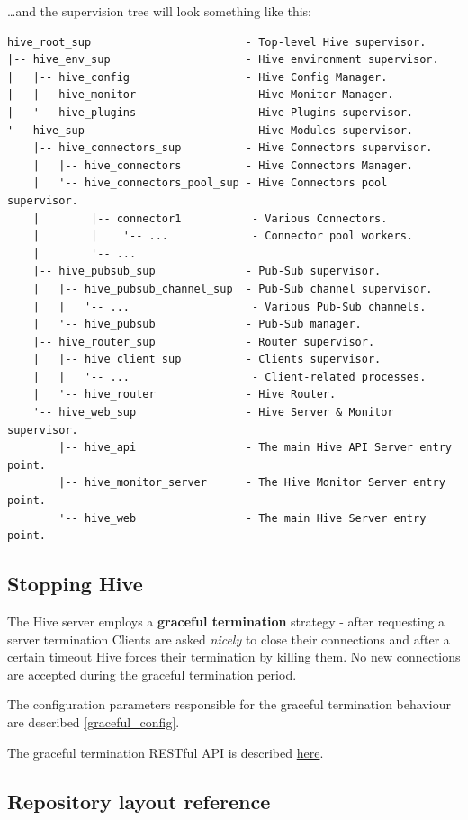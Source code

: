 \documentclass[a4paper]{article}
\begin{document}
\noindent
\ldots{}and the supervision tree will look something like this:


\begin{verbatim}
hive_root_sup                        - Top-level Hive supervisor.
|-- hive_env_sup                     - Hive environment supervisor.
|   |-- hive_config                  - Hive Config Manager.
|   |-- hive_monitor                 - Hive Monitor Manager.
|   '-- hive_plugins                 - Hive Plugins supervisor.
'-- hive_sup                         - Hive Modules supervisor.
    |-- hive_connectors_sup          - Hive Connectors supervisor.
    |   |-- hive_connectors          - Hive Connectors Manager.
    |   '-- hive_connectors_pool_sup - Hive Connectors pool supervisor.
    |        |-- connector1           - Various Connectors.
    |        |    '-- ...             - Connector pool workers.
    |        '-- ...
    |-- hive_pubsub_sup              - Pub-Sub supervisor.
    |   |-- hive_pubsub_channel_sup  - Pub-Sub channel supervisor.
    |   |   '-- ...                   - Various Pub-Sub channels.
    |   '-- hive_pubsub              - Pub-Sub manager.
    |-- hive_router_sup              - Router supervisor.
    |   |-- hive_client_sup          - Clients supervisor.
    |   |   '-- ...                   - Client-related processes.
    |   '-- hive_router              - Hive Router.
    '-- hive_web_sup                 - Hive Server & Monitor supervisor.
        |-- hive_api                 - The main Hive API Server entry point.
        |-- hive_monitor_server      - The Hive Monitor Server entry point.
        '-- hive_web                 - The main Hive Server entry point.
\end{verbatim}
\subsection{Stopping Hive}
\label{sec-2-4}

The Hive server employs a \textbf{graceful termination} strategy - after requesting a server termination Clients are asked \emph{nicely} to close their connections and after a certain timeout Hive forces their termination by killing them. No new connections are accepted during the graceful termination period.

\noindent
The configuration parameters responsible for the graceful termination behaviour are described \ref{graceful_config}.

\noindent
The graceful termination RESTful API is described \hyperref[sec-6-1-1]{here}.
\subsection{Repository layout reference}
\label{sec-2-5}
\end{document}
